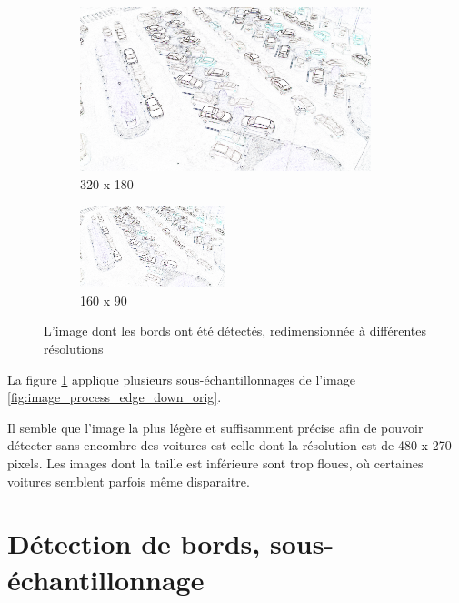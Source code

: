\begin{appendix}
\begin{figure}[H]
    \bigskip
    \begin{subfigure}{.5\textwidth}
        \centering
        \includegraphics[width=.85\linewidth]{img/conception/image_process/edge-downsample/1.png}
        \caption{320 x 180}
    \end{subfigure}%
    \begin{subfigure}{.5\textwidth}
        \centering
        \includegraphics[width=.85\linewidth]{img/conception/image_process/edge-downsample/0.png}
        \caption{160 x 90}
    \end{subfigure}%
    \centering
    \caption{L'image dont les bords ont été détectés, redimensionnée à différentes résolutions}
    \label{fig:image_process_edge_down}
\end{figure}

La figure \ref{fig:image_process_edge_down} applique plusieurs sous-échantillonnages de l'image \ref{fig:image_process_edge_down_orig}.

Il semble que l'image la plus légère et suffisamment précise afin de pouvoir détecter sans encombre des voitures est celle dont la résolution est de 480 x 270 pixels. Les images dont la taille est inférieure sont trop floues, où certaines voitures semblent parfois même disparaitre.


\section{Détection de bords, sous-échantillonnage} \label{annexe.traitement.down_edge}


\end{appendix}
